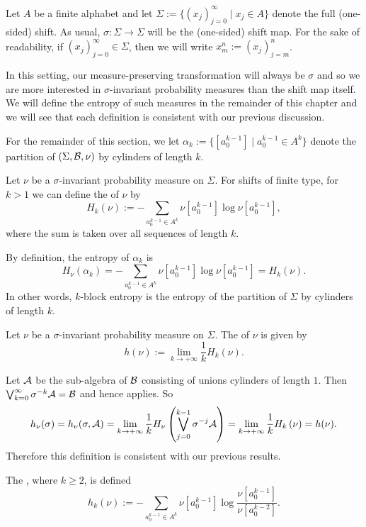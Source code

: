 Let $A$ be a finite alphabet and let $\Sigma := \{(x_j)_{j = 0}^\infty \mid x_j \in A\}$ denote the full (one-sided) shift. As usual, $\sigma : \Sigma \to \Sigma$ will be the (one-sided) shift map. For the sake of readability, if $(x_j)_{j = 0}^\infty \in \Sigma$, then we will write $x_m^n := (x_j)_{j = m}^n$.

In this setting, our measure-preserving transformation will always be $\sigma$ and so we are more interested in $\sigma$-invariant probability measures than the shift map itself. We will define the entropy of such measures in the remainder of this chapter and we will see that each definition is consistent with our previous discussion.

For the remainder of this section, we let $\alpha_k := \{[a_0^{k - 1}] \mid a_0^{k - 1} \in A^k\}$ denote the partition of $(\Sigma, \mathcal{B}, \nu)$ by cylinders of length $k$.

\begin{definition}
	Let $\nu$ be a $\sigma$-invariant probability measure on $\Sigma$. For shifts of finite type, for $k > 1$ we can define the  of $\nu$ by
	\[
		H_k(\nu) := -\sum_{a_0^{k - 1} \in A^k}{\nu[a_0^{k - 1}] \log\nu[a_0^{k - 1}]},
	\]
	where the sum is taken over all sequences of length $k$.
\end{definition}

By definition, the entropy of $\alpha_k$ is
\[
	H_\nu(\alpha_k) = -\sum_{a_0^{k - 1} \in A^k}{\nu[a_0^{k - 1}] \log\nu[a_0^{k - 1}]} = H_k(\nu).
\]
In other words, $k$-block entropy is the entropy of the partition of $\Sigma$ by cylinders of length $k$.

\begin{definition}
	Let $\nu$ be a $\sigma$-invariant probability measure on $\Sigma$. The  of $\nu$ is given by
	\[
		h(\nu) := \lim_{k \to +\infty}{\frac{1}{k} H_k(\nu)}.
	\]
\end{definition}

Let $\mathcal{A}$ be the sub-algebra of $\mathcal{B}$ consisting of unions cylinders of length $1$. Then $\bigvee_{k = 0}^\infty{\sigma^{-k}{\mathcal{A}}} = \mathcal{B}$ and hence  applies. So
\[
	h_\nu(\sigma) = h_\nu(\sigma, \mathcal{A}) = \lim_{k \to +\infty}{\frac{1}{k} H_\nu\left(\bigvee_{j = 0}^{k - 1}{\sigma^{-j}{\mathcal{A}}}\right)} = \lim_{k \to +\infty}{\frac{1}{k} H_k\left(\nu\right)} = h(\nu).
\]
Therefore this definition is consistent with our previous results.

\begin{definition}
	The , where $k \geq 2$, is defined
	\[
		h_k(\nu) := -\sum_{a_0^{k - 1} \in A^k}{\nu[a_0^{k - 1}] \log{\frac{\nu[a_0^{k - 1}]}{\nu[a_0^{k - 2}]}}}.
	\]
\end{definition}

